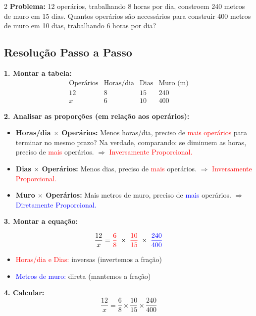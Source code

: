 \documentclass[11pt]{article}
\begin{document}
\begin{multicols}{2}
\textbf{Problema:} 12 operários, trabalhando 8 horas por dia, constroem 240 metros de muro em 15 dias. Quantos operários são necessários para construir 400 metros de muro em 10 dias, trabalhando 6 horas por dia?

\subsection*{Resolução Passo a Passo}

\textbf{1. Montar a tabela:}
\[
\begin{array}{c|c|c|c}
\text{Operários} & \text{Horas/dia} & \text{Dias} & \text{Muro (m)} \\
\hline
12 & 8 & 15 & 240 \\
x & 6 & 10 & 400
\end{array}
\]

\textbf{2. Analisar as proporções (em relação aos operários):}
\begin{itemize}
    \item \textbf{Horas/dia $\times$ Operários:} Menos horas/dia, preciso de \textcolor{red}{mais operários} para terminar no mesmo prazo? Na verdade, comparando: se diminuem as horas, preciso de \textcolor{red}{mais} operários. $\Rightarrow$ \textcolor{red}{Inversamente Proporcional.}
    \item \textbf{Dias $\times$ Operários:} Menos dias, preciso de \textcolor{red}{mais} operários. $\Rightarrow$ \textcolor{red}{Inversamente Proporcional.}
    \item \textbf{Muro $\times$ Operários:} Mais metros de muro, preciso de \textcolor{blue}{mais} operários. $\Rightarrow$ \textcolor{blue}{Diretamente Proporcional.}
\end{itemize}

\textbf{3. Montar a equação:}

\[
\frac{12}{x} = 
{\color{red}\frac{6}{8}} \; \times \;
{\color{red}\frac{10}{15}} \; \times \;
{\color{blue}\frac{240}{400}}
\]
{\footnotesize
\begin{itemize}
    \item[\textcolor{red}{$\blacktriangleright$}] \textcolor{red}{Horas/dia e Dias:} inversas (invertemos a fração)
    \item[\textcolor{blue}{$\blacktriangleright$}] \textcolor{blue}{Metros de muro:} direta (mantemos a fração)
\end{itemize}
}

\textbf{4. Calcular:}
\[
\frac{12}{x} = \frac{6}{8} \times \frac{10}{15} \times \frac{240}{400}
\]


\end{multicols}
\end{document}
